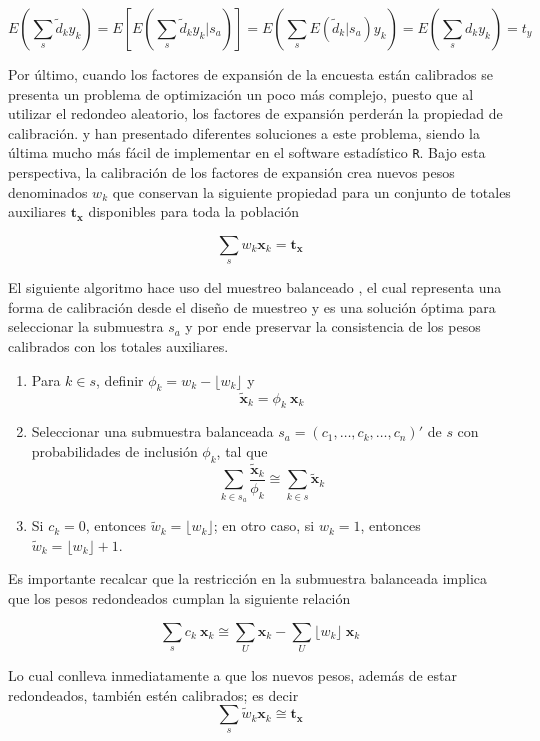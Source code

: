 \documentclass[
  12pt,
  spanish,
]{book}
\begin{document}
\[
E \left( \sum_s \tilde d_k y_k \right) 
= E \left[ E \left( \sum_s \tilde d_k y_k  | s_a\right)  \right] 
= E \left( \sum_s E(\tilde d_k | s_a) y_k \right) 
= E \left( \sum_s d_k y_k \right) = t_y
\]

Por último, cuando los factores de expansión de la encuesta están calibrados se presenta un problema de optimización un poco más complejo, puesto que al utilizar el redondeo aleatorio, los factores de expansión perderán la propiedad de calibración. \citet{Sartore_Toppin_Young_Spiegelman_2019} y \citet{Tille} han presentado diferentes soluciones a este problema, siendo la última mucho más fácil de implementar en el software estadístico \texttt{R}. Bajo esta perspectiva, la calibración de los factores de expansión crea nuevos pesos denominados \(w_k\) que conservan la siguiente propiedad para un conjunto de totales auxiliares \(\mathbf{t_x}\) disponibles para toda la población

\[
\sum_s w_k \mathbf{x}_k =  \mathbf{t_x}
\]

El siguiente algoritmo hace uso del muestreo balanceado \citep[capítulo 8]{Tille_2006}, el cual representa una forma de calibración desde el diseño de muestreo y es una solución óptima para seleccionar la submuestra \(s_a\) y por ende preservar la consistencia de los pesos calibrados con los totales auxiliares.

\begin{enumerate}
\def\labelenumi{\arabic{enumi}.}
\item
  Para \(k \in s\), definir \(\phi_k = w_k - \lfloor w_k \rfloor\) y
  \[
  \tilde{\mathbf{x}}_k = \phi_k \ \mathbf{x}_k
  \]
\item
  Seleccionar una submuestra balanceada \(s_a=(c_1,\ldots,c_k,\ldots,c_n)'\) de \(s\) con probabilidades de inclusión \(\phi_k\), tal que
  \[
  \sum_{k \in s_a} \frac{\tilde{\mathbf{x}}_k}{\phi_k} 
  \cong
  \sum_{k \in s} \tilde{\mathbf{x}}_k
  \]
\item
  Si \(c_k = 0\), entonces \(\tilde w_k = \lfloor w_k \rfloor\); en otro caso, si \(w_k = 1\), entonces \(\tilde w_k = \lfloor w_k \rfloor + 1\).
\end{enumerate}

Es importante recalcar que la restricción en la submuestra balanceada implica que los pesos redondeados cumplan la siguiente relación

\[
\sum_s c_k \ \mathbf{x}_k 
\cong \sum_U \mathbf{x}_k 
- \sum_U \lfloor w_k \rfloor \ \mathbf{x}_k 
\]

Lo cual conlleva inmediatamente a que los nuevos pesos, además de estar redondeados, también estén calibrados; es decir
\[
\sum_s \tilde w_k \mathbf{x}_k \cong  \mathbf{t_x}
\]
\end{document}
